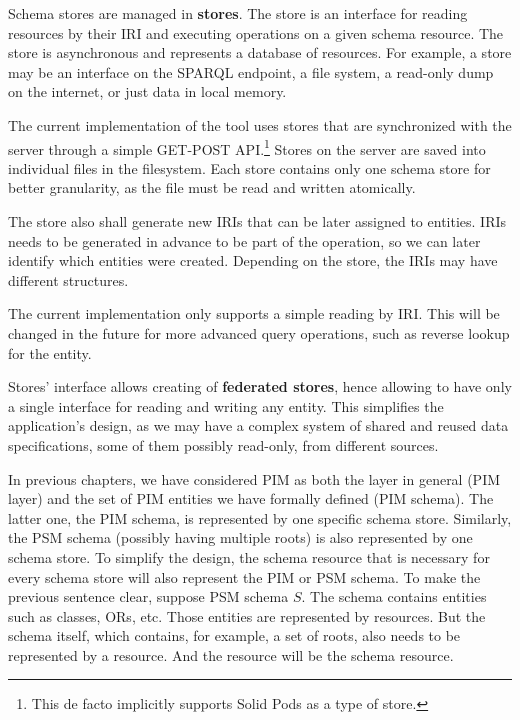 Schema stores are managed in \textbf{stores}. The store is an interface for reading resources by their IRI and executing operations on a given schema resource. The store is asynchronous and represents a database of resources. For example, a store may be an interface on the SPARQL endpoint, a file system, a read-only dump on the internet, or just data in local memory.

The current implementation of the tool uses stores that are synchronized with the server through a simple GET-POST API.\footnote{This de facto implicitly supports Solid Pods as a type of store.} Stores on the server are saved into individual files in the filesystem. Each store contains only one schema store for better granularity, as the file must be read and written atomically.

\medskip

The store also shall generate new IRIs that can be later assigned to entities. IRIs needs to be generated in advance to be part of the operation, so we can later identify which entities were created. Depending on the store, the IRIs may have different structures.

The current implementation only supports a simple reading by IRI. This will be changed in the future for more advanced query operations, such as reverse lookup for the entity.

\medskip

Stores' interface allows creating of \textbf{federated stores}, hence allowing to have only a single interface for reading and writing any entity. This simplifies the application's design, as we may have a complex system of shared and reused data specifications, some of them possibly read-only, from different sources.

\medskip

In previous chapters, we have considered PIM as both the layer in general (PIM layer) and the set of PIM entities we have formally defined (PIM schema). The latter one, the PIM schema, is represented by one specific schema store. Similarly, the PSM schema (possibly having multiple roots) is also represented by one schema store. To simplify the design, the schema resource that is necessary for every schema store will also represent the PIM or PSM schema. To make the previous sentence clear, suppose PSM schema $S$. The schema contains entities such as classes, ORs, etc. Those entities are represented by resources. But the schema itself, which contains, for example, a set of roots, also needs to be represented by a resource. And the resource will be the schema resource.

